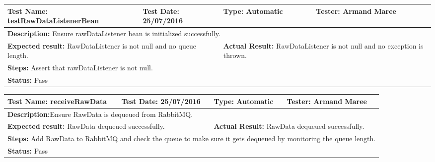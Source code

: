 \documentclass[hidelinks,english]{article}
\begin{document}
				\begin{center}
					\begin{tabular}{p{4cm} p{4cm} p{4cm} p{4cm}}
					\hline
					\multicolumn{1}{L{4cm}}{\textbf{Test Name:} testRawDataListenerBean} & \multicolumn{1}{L{4cm}}{\textbf{Test Date:} 25/07/2016} & \multicolumn{1}{L{4cm}}{\textbf{Type:} Automatic} & \multicolumn{1}{L{4cm}}{\textbf{Tester:} Armand Maree} \\ \hline \hline
					\multicolumn{4}{L{16cm}}{\textbf{Description:} Ensure rawDataListener bean is initialized successfully.} \\
					\multicolumn{2}{L{8cm}}{\textbf{Expected result:} RawDataListener is not null and no queue length.} & \multicolumn{2}{L{8cm}}{\textbf{Actual Result:} RawDataListener is not null and no exception is thrown.} \\ \multicolumn{4}{L{16cm}}{\textbf{Steps:} Assert that rawDataListener is not null.} \\
					\multicolumn{4}{L{16cm}}{\textbf{Status:} Pass}\\ \hline
					\end{tabular}
				\end{center}
				
				\begin{center}
					\begin{tabular}{p{4cm} p{4cm} p{4cm} p{4cm}}
					\hline
					\multicolumn{1}{L{4cm}}{\textbf{Test Name:} receiveRawData} & \multicolumn{1}{L{4cm}}{\textbf{Test Date:} 25/07/2016} & \multicolumn{1}{L{4cm}}{\textbf{Type:} Automatic} & \multicolumn{1}{L{4cm}}{\textbf{Tester:} Armand Maree} \\ \hline \hline
					\multicolumn{4}{L{16cm}}{\textbf{Description:}Ensure RawData is dequeued from RabbitMQ.} \\
					\multicolumn{2}{L{8cm}}{\textbf{Expected result:} RawData dequeued successfully.} & \multicolumn{2}{L{8cm}}{\textbf{Actual Result:} RawData dequeued successfully.} \\ \multicolumn{4}{L{16cm}}{\textbf{Steps:} Add RawData to RabbitMQ and check the queue to make sure it gets dequeued by monitoring the queue length.} \\
					\multicolumn{4}{L{16cm}}{\textbf{Status:} Pass}\\ \hline
					\end{tabular}
				\end{center}
				
\end{document}
